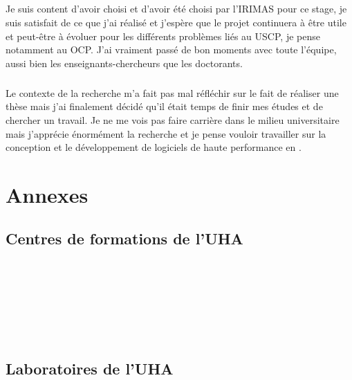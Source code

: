 \documentclass[a4paper,11pt,twoside,french,report]{../common/simplem}
\begin{document}
		\paragraph*{}
			Je suis content d'avoir choisi et d'avoir été choisi par l'\gls{IRIMAS} pour ce stage, je suis satisfait de ce que j'ai réalisé et j'espère que le projet continuera à être utile et peut-être à évoluer pour les différents problèmes liés au \gls{USCP}, je pense notamment au \gls{OCP}. J'ai vraiment passé de bon moments avec toute l'équipe, aussi bien les enseignants-chercheurs que les doctorants.
		\paragraph*{}
			Le contexte de la recherche m'a fait pas mal réfléchir sur le fait de réaliser une thèse mais j'ai finalement décidé qu'il était temps de finir mes études et de chercher un travail. Je ne me vois pas faire carrière dans le milieu universitaire mais j'apprécie énormément la recherche et je pense vouloir travailler sur la conception et le développement de logiciels de haute performance en \Cpp{}.
	\printbibliography[heading=bibintoc]{}
	\printglossary[type=\acronymtype,nogroupskip=true,title=Lexique,toctitle=Lexique]{}
	\chapter*{Annexes}
		\setcounter{section}{0}
		\renewcommand{\thesection}{\Alph{section}}
		\renewcommand{\theHsection}{appendixsection.\Alph{section}}
		\section{Centres de formations de l'\acrshort{UHA}}\label{sec:uha_formation}
			\paragraph*{}
				
				\hfill\\
			\paragraph*{}
				
				\hfill\\
			\paragraph*{}
				
				\hfill\\
		\newpage\section{Laboratoires de l'\acrshort{UHA}}\label{sec:uha_laboratories}
\end{document}
